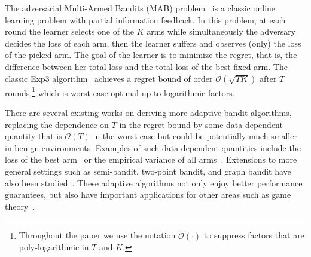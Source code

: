 
The adversarial Multi-Armed Bandits (MAB) problem~\citep{auer2002nonstochastic} is a classic online learning problem with partial information feedback.
In this problem, at each round the learner selects one of the $K$ arms while simultaneously the adversary decides the loss of each arm,
then the learner suffers and observes (only) the loss of the picked arm.
The goal of the learner is to minimize the regret, that is, the difference between her total loss and the total loss of the best fixed arm.
The classic Exp3 algorithm~\citep{auer2002nonstochastic} achieves a regret bound of order $\tilde{\mathcal{O}}(\sqrt{TK})$ after $T$ rounds,\footnote{%
Throughout the paper we use the notation $\tilde{\mathcal{O}}(\cdot)$ to suppress factors that are poly-logarithmic in $T$ and $K$.}
which is worst-case optimal up to logarithmic factors.

There are several existing works on deriving more adaptive bandit algorithms, replacing the dependence on $T$ in the regret bound
by some data-dependent quantity that is $\mathcal{O}(T)$ in the worst-case but could be potentially much smaller in benign environments.
Examples of such data-dependent quantities include the loss of the best arm~\citep{allenberg2006hannan, foster2016learning} or the empirical variance of all arms~\citep{hazan2011better, bubeck2017sparsity}. 
Extensions to more general settings such as semi-bandit, two-point bandit, and graph bandit have also been studied~\citep{neu2015first, chiang2013beating, lykouris2017small}.
These adaptive algorithms not only enjoy better performance guarantees,
but also have important applications for other areas such as game theory~\citep{foster2016learning}.

